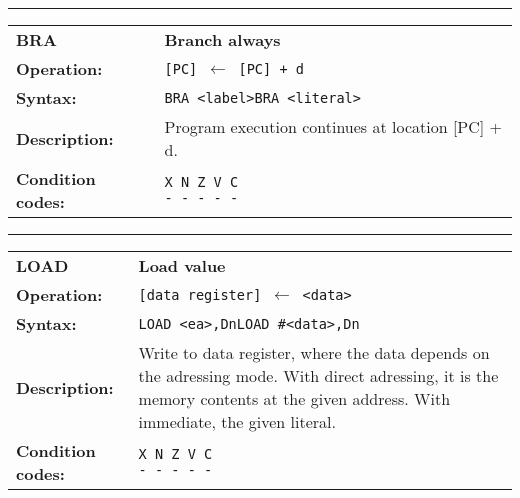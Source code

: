 \documentclass[]{article}
\begin{document}
\begin{appendices}
\noindent\rule{10cm}{1pt}\newline %
\setlength\extrarowheight{5pt} %
\begin{tabularx}{\textwidth}{lL}
  {\Large \textbf{BRA}} 	& {\Large \textbf{Branch always}}\\
  \textbf{Operation:} 		& \texttt{[PC] $\leftarrow$ [PC] + d}\\
  \textbf{Syntax:}  		& \texttt{BRA <label>}\newline\texttt{BRA <literal>}\\
  \textbf{Description:}  	& Program execution continues at location [PC] + d.\\
  \textbf{Condition codes:} & \texttt{X N Z V C\newline - - - - -}\\
\end{tabularx}
\newline

\newpage

\noindent\rule{10cm}{1pt}\newline %
\setlength\extrarowheight{5pt} %
\begin{tabularx}{\textwidth}{lL}
  {\Large \textbf{LOAD}} 	& {\Large \textbf{Load value}}\\
  \textbf{Operation:} 		& \texttt{[data register] $\leftarrow$ <data>}\\
  \textbf{Syntax:}  		& \texttt{LOAD <ea>,Dn}\newline\texttt{LOAD \#<data>,Dn}\\
  \textbf{Description:}  	& Write to data register, where the data depends on the adressing mode. With direct adressing, it is the memory contents at the given address. With immediate, the given literal.\\
  \textbf{Condition codes:} & \texttt{X N Z V C\newline - - - - -}\\
\end{tabularx}
\newline


\end{appendices}
\end{document}
